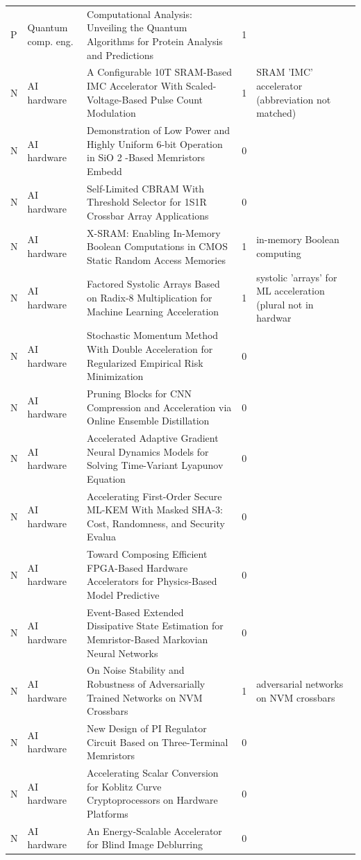 \documentclass[10pt]{article}
\begin{document}
\begin{longtable}{@{}llL{8.6cm}lL{4.2cm}@{}}
P & Quantum comp. eng. & Computational Analysis: Unveiling the Quantum Algorithms for Protein Analysis and Predictions & 1 &  \\
N & AI hardware & A Configurable 10T SRAM-Based IMC Accelerator With Scaled-Voltage-Based Pulse Count Modulation  & 1 & SRAM 'IMC' accelerator (abbreviation not matched) \\
N & AI hardware & Demonstration of Low Power and Highly Uniform 6-bit Operation in SiO 2 -Based Memristors Embedd & 0 &  \\
N & AI hardware & Self-Limited CBRAM With Threshold Selector for 1S1R Crossbar Array Applications & 0 &  \\
N & AI hardware & X-SRAM: Enabling In-Memory Boolean Computations in CMOS Static Random Access Memories & 1 & in-memory Boolean computing \\
N & AI hardware & Factored Systolic Arrays Based on Radix-8 Multiplication for Machine Learning Acceleration & 1 & systolic 'arrays' for ML acceleration (plural not in hardwar \\
N & AI hardware & Stochastic Momentum Method With Double Acceleration for Regularized Empirical Risk Minimization & 0 &  \\
N & AI hardware & Pruning Blocks for CNN Compression and Acceleration via Online Ensemble Distillation & 0 &  \\
N & AI hardware & Accelerated Adaptive Gradient Neural Dynamics Models for Solving Time-Variant Lyapunov Equation & 0 &  \\
N & AI hardware & Accelerating First-Order Secure ML-KEM With Masked SHA-3: Cost, Randomness, and Security Evalua & 0 &  \\
N & AI hardware & Toward Composing Efficient FPGA-Based Hardware Accelerators for Physics-Based Model Predictive  & 0 &  \\
N & AI hardware & Event-Based Extended Dissipative State Estimation for Memristor-Based Markovian Neural Networks & 0 &  \\
N & AI hardware & On Noise Stability and Robustness of Adversarially Trained Networks on NVM Crossbars & 1 & adversarial networks on NVM crossbars \\
N & AI hardware & New Design of PI Regulator Circuit Based on Three-Terminal Memristors & 0 &  \\
N & AI hardware & Accelerating Scalar Conversion for Koblitz Curve Cryptoprocessors on Hardware Platforms & 0 &  \\
N & AI hardware & An Energy-Scalable Accelerator for Blind Image Deblurring & 0 &  \\

\end{longtable}
\end{document}
